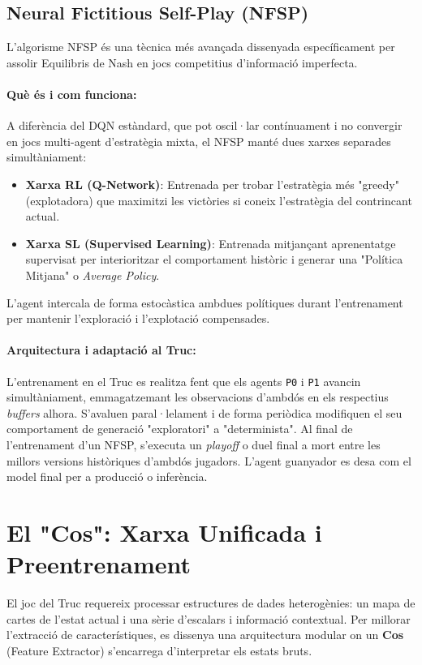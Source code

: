 \documentclass[a4paper,11pt]{article}
\begin{document}
\subsection{Neural Fictitious Self-Play (NFSP)}
L'algorisme NFSP és una tècnica més avançada dissenyada específicament per assolir Equilibris de Nash en jocs competitius d'informació imperfecta.

\paragraph{Què és i com funciona:}
A diferència del DQN estàndard, que pot oscil·lar contínuament i no convergir en jocs multi-agent d'estratègia mixta, el NFSP manté dues xarxes separades simultàniament:
\begin{itemize}
    \item \textbf{Xarxa RL (Q-Network)}: Entrenada per trobar l'estratègia més "greedy" (explotadora) que maximitzi les victòries si coneix l'estratègia del contrincant actual.
    \item \textbf{Xarxa SL (Supervised Learning)}: Entrenada mitjançant aprenentatge supervisat per interioritzar el comportament històric i generar una "Política Mitjana" o \textit{Average Policy}.
\end{itemize}
L'agent intercala de forma estocàstica ambdues polítiques durant l'entrenament per mantenir l'exploració i l'explotació compensades.

\paragraph{Arquitectura i adaptació al Truc:}
L'entrenament en el Truc es realitza fent que els agents \texttt{P0} i \texttt{P1} avancin simultàniament, emmagatzemant les observacions d'ambdós en els respectius \textit{buffers} alhora. S'avaluen paral·lelament i de forma periòdica modifiquen el seu comportament de generació "exploratori" a "determinista". Al final de l'entrenament d'un NFSP, s'executa un \textit{playoff} o duel final a mort entre les millors versions històriques d'ambdós jugadors. L'agent guanyador es desa com el model final per a producció o inferència.


\section{El "Cos": Xarxa Unificada i Preentrenament}
El joc del Truc requereix processar estructures de dades heterogènies: un mapa de cartes de l'estat actual i una sèrie d'escalars i informació contextual. Per millorar l'extracció de característiques, es dissenya una arquitectura modular on un \textbf{Cos} (Feature Extractor) s'encarrega d'interpretar els estats bruts.
\end{document}
